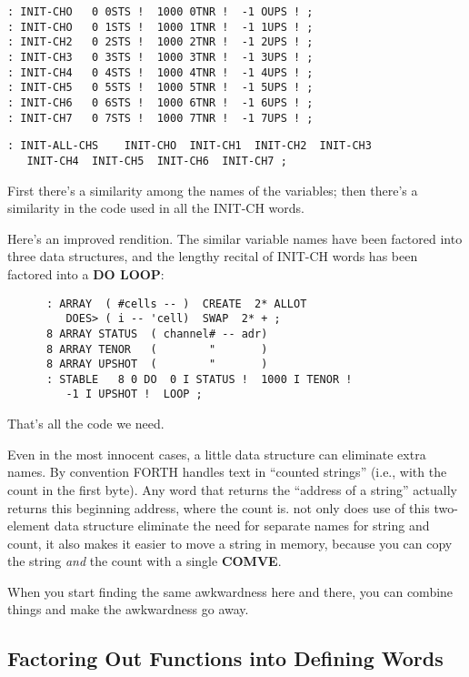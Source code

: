 \begin{verbatim} 
: INIT-CHO   0 0STS !  1000 0TNR !  -1 OUPS ! ; 
: INIT-CHO   0 1STS !  1000 1TNR !  -1 1UPS ! ; 
: INIT-CH2   0 2STS !  1000 2TNR !  -1 2UPS ! ; 
: INIT-CH3   0 3STS !  1000 3TNR !  -1 3UPS ! ; 
: INIT-CH4   0 4STS !  1000 4TNR !  -1 4UPS ! ; 
: INIT-CH5   0 5STS !  1000 5TNR !  -1 5UPS ! ; 
: INIT-CH6   0 6STS !  1000 6TNR !  -1 6UPS ! ; 
: INIT-CH7   0 7STS !  1000 7TNR !  -1 7UPS ! ; 
\end{verbatim}

\begin{verbatim} 
: INIT-ALL-CHS    INIT-CHO  INIT-CH1  INIT-CH2  INIT-CH3
   INIT-CH4  INIT-CH5  INIT-CH6  INIT-CH7 ;
\end{verbatim}
First there's a similarity among the names of the variables; then there's a similarity in the code used in all the INIT-CH words.

Here's an improved rendition. The similar variable names have been factored into three data structures, and the lengthy recital of INIT-CH words has been factored into a \textbf{DO LOOP}:

\begin{verbatim}
      : ARRAY  ( #cells -- )  CREATE  2* ALLOT
         DOES> ( i -- 'cell)  SWAP  2* + ; 
      8 ARRAY STATUS  ( channel# -- adr)
      8 ARRAY TENOR   (        "       )
      8 ARRAY UPSHOT  (        "       )
      : STABLE   8 0 DO  0 I STATUS !  1000 I TENOR ! 
         -1 I UPSHOT !  LOOP ;
\end{verbatim}

\noindent That's all the code we need.

Even in the most innocent cases, a little data structure can eliminate extra names. By convention FORTH handles text in ``counted strings'' (i.e., with the count in the first byte). Any word that returns the ``address of a string'' actually returns this beginning address, where the count is. not only does use of this two-element data structure eliminate the need for separate names for string and count, it also makes it easier to move a string in memory, because you can copy the string \textit{and} the count
with a single \textbf{COMVE}.

When you start finding the same awkwardness here and there, you can combine things and make the awkwardness go away.

\subsection{{Factoring Out Functions into Defining Words}}

